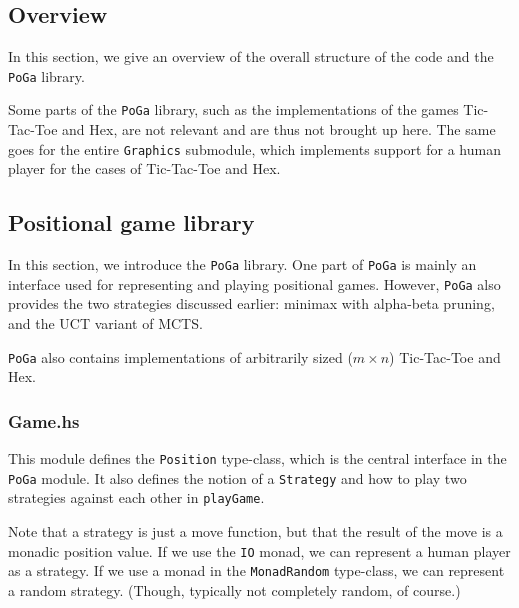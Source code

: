 \subsection {Overview}

In this section, we give an overview of the overall structure of the code and the \texttt{PoGa} library.


Some parts of the \texttt{PoGa} library, such as the implementations of the games Tic-Tac-Toe and Hex, are not relevant and are thus not brought up here.
The same goes for the entire \texttt{Graphics} submodule, which implements support for a human player for the cases of Tic-Tac-Toe and Hex.

\subsection {Positional game library}

In this section, we introduce the \texttt{PoGa} library.
One part of \texttt{PoGa} is mainly an interface used for representing and playing positional games.
However, \texttt{PoGa} also provides the two strategies discussed earlier: minimax with alpha-beta pruning, and the UCT variant of MCTS.

\texttt{PoGa} also contains implementations of arbitrarily sized ($m \times n$) Tic-Tac-Toe and Hex.

\subsubsection {Game.hs}

This module defines the \texttt{Position} type-class, which is the central interface in the \texttt{PoGa} module.
It also defines the notion of a \texttt{Strategy} and how to play two strategies against each other in \texttt{playGame}.

Note that a strategy is just a move function, but that the result of the move is a monadic position value.
If we use the \texttt{IO} monad, we can represent a human player as a strategy. If we use a monad in the \texttt{MonadRandom} type-class, we can represent a random strategy. (Though, typically not completely random, of course.)

